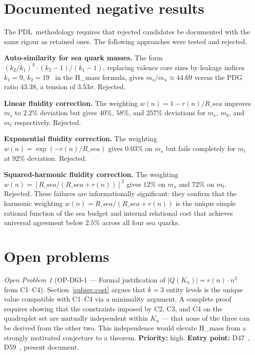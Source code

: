 \documentclass[12pt,a4paper]{article}
\def\PDL{PDL}
\def\Rsea{R\_sea}
\def\QQ{Q}
\theoremstyle{plain}
\theoremstyle{definition}
\theoremstyle{remark}
\newtheorem{openproblem}[theorem]{Open Problem}
\newcommand{\PDL}{\textnormal{PDL}}
\newcommand{\Rsea}{R_{\mathrm{sea}}}
\newcommand{\mstrange}{m_s}
\newcommand{\mcharm}{m_c}
\newcommand{\mbottom}{m_b}
\newcommand{\mtop}{m_t}
\newcommand{\QQ}{\mathcal{Q}}
\begin{document}
\section{Documented negative results}
\label{sec:negative}

The \PDL\ methodology requires that rejected candidates be documented with the same rigour as retained ones. The following approaches were tested and rejected.

\textbf{Auto-similarity for sea quark masses.} The form $(k_2/k_1)^4 \cdot (k_2-1)/(k_1-1)$, replacing valence core sizes by leakage indices $k_1 = 9$, $k_2 = 19$~\cite{D51} in the H\_mass formula, gives $m_s/m_u \approx 44.69$ versus the PDG ratio $43.38$, a tension of $3.53\sigma$. Rejected.

\textbf{Linear fluidity correction.} The weighting $w(n) = 1 - r(n)/\Rsea$ improves $\mstrange$ to $2.2\%$ deviation but gives $40\%$, $58\%$, and $257\%$ deviations for $\mcharm$, $\mbottom$, and $\mtop$ respectively. Rejected.

\textbf{Exponential fluidity correction.} The weighting $w(n) = \exp(-r(n)/\Rsea)$ gives $0.03\%$ on $\mstrange$ but fails completely for $\mtop$ at $92\%$ deviation. Rejected.

\textbf{Squared-harmonic fluidity correction.} The weighting $w(n) = [\Rsea/(\Rsea + r(n))]^2$ gives $12\%$ on $\mstrange$ and $72\%$ on $\mtop$. Rejected. These failures are informationally significant: they confirm that the harmonic weighting $w(n) = \Rsea/(\Rsea + r(n))$ is the unique simple rational function of the sea budget and internal relational cost that achieves universal agreement below $2.5\%$ across all four sea quarks.

\section{Open problems}
\label{sec:openproblems}

\begin{openproblem}[\texorpdfstring{OP-D63-1 --- Formal justification of $|\QQ(K_n)| = r(n) \cdot n^3$ from C1--C4}{OP-D63-1 --- Formal justification of the quadruplet formula}]
\label{op:1}
Section~\ref{subsec:cost} argues that $k = 3$ entity levels is the unique value compatible with C1--C4 via a minimality argument. A complete proof requires showing that the constraints imposed by C2, C3, and C4 on the quadruplet set are mutually independent within $K_n$ --- that none of the three can be derived from the other two. This independence would elevate H\_mass from a strongly motivated conjecture to a theorem. \textbf{Priority:} high. \textbf{Entry point:} D47~\cite{D47}, D59~\cite{D59}, present document.
\end{openproblem}
\end{document}
